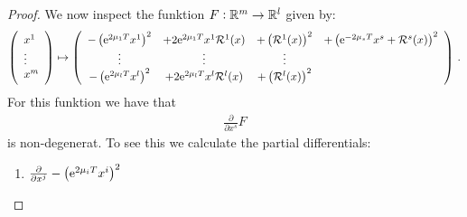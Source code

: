 \begin{proof}
We now inspect the funktion $F:\mathbb{R}^m\to \mathbb{R}^l$ given by:
\begin{equation*}
\left(\begin{array}{l}
	x^1\\ \vdots \\x^m
\end{array}\right) \mapsto	\left(\begin{array}{cccc}
		-\left(\mathrm{e}^{2\mu_{1}T}x^{1}\right)^2&+2\mathrm{e}^{2\mu_{1}T}x^{1}\mathcal{R}^1(x)&+\left(\mathcal{R}^{1}(x)\right)^2&	+\left(\mathrm{e}^{-2\mu_sT}x^s+\mathcal{R}^s(x)\right)^2\\
		\vdots &\vdots&\vdots&\\ 
		-\left(\mathrm{e}^{2\mu_{l}T}x^{l}\right)^2&+2\mathrm{e}^{2\mu_{l}T}x^{l}\mathcal{R}^l(x)&+\left(\mathcal{R}^{l}(x)\right)^2&\\
	\end{array}\right)\, .
\end{equation*} For this funktion we have that 
\begin{align*}
\frac{\partial}{\partial x^s}F
\end{align*} is non-degenerat. To see this we calculate the partial differentials:
\begin{enumerate}
	\item $\frac{\partial}{\partial x^j} -\left(\mathrm{e}^{2\mu_{i}T}x^{i}\right)^2$
\end{enumerate}
\end{proof}


